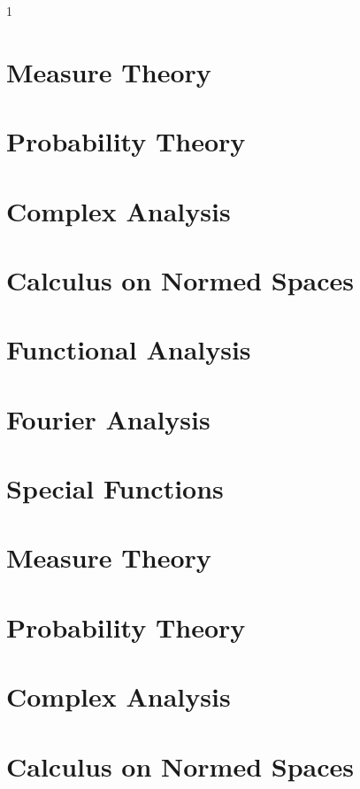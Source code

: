 \documentclass{book}                                                           %
\newcommand*{\TOPPATH}{books}
\newcommand*{\PATH}{\TOPPATH/}
\def\compileanalysis{0}
\begin{document}
    \if\compileanalysis1
        \part{Measure Theory}
            
        \part{Probability Theory}
            
        \part{Complex Analysis}
            
        \part{Calculus on Normed Spaces}
            
        \part{Functional Analysis}
            
        \part{Fourier Analysis}
            
            
        \part{Special Functions}
            
            
    \else
        \part{Measure Theory}
        \part{Probability Theory}
        \part{Complex Analysis}
        \part{Calculus on Normed Spaces}
\end{document}
